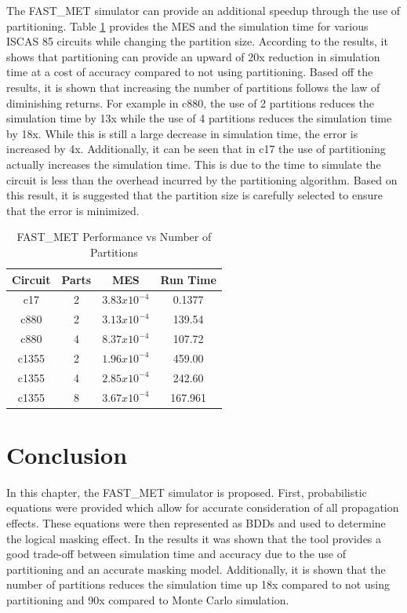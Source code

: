 The FAST\_MET simulator can provide an additional speedup through the use of partitioning. Table \ref{table:restable} provides the MES and the simulation time for various ISCAS 85 circuits while changing the partition size. According to the results, it shows that partitioning can provide an upward of 20x reduction in simulation time at a cost of accuracy compared to not using partitioning. Based off the results, it is shown that increasing the number of partitions follows the law of diminishing returns. For example in c880, the use of 2 partitions reduces the simulation time by 13x while the use of 4 partitions reduces the simulation time by 18x. While this is still a large decrease in simulation time, the error is increased by 4x. Additionally, it can be seen that in c17 the use of partitioning actually increases the simulation time. This is due to the time to simulate the circuit is less than the overhead incurred by the partitioning algorithm. Based on this result, it is suggested that the partition size is carefully selected to ensure that the error is minimized.

\begin{table}[ht]
	\begin{center}
		\caption{FAST\_MET Performance vs Number of Partitions}
		\label{table:restable}
		\begin{tabular}{|c|c|c|c|}
			\hline
			Circuit& Parts & MES & Run Time\\ 
			\hline
			c17 & 2 & $3.83x10^{-4}$ & 0.1377\\
			\hline
			c880 & 2 & $3.13x10^{-4}$ & 139.54\\
			\hline
			c880 & 4 & $8.37x10^{-4}$ & 107.72\\
			\hline
			c1355 & 2 & $1.96x10^{-4}$ & 459.00\\
			\hline
			c1355 & 4 & $2.85x10^{-4}$ & 242.60\\
			\hline
			c1355 & 8 & $3.67x10^{-4}$ & 167.961\\
			\hline
		\end{tabular}
	\end{center}
\end{table}

\section{Conclusion}
In this chapter, the FAST\_MET simulator is proposed. First, probabilistic equations were provided which allow for accurate consideration of all propagation effects. These equations were then represented as BDDs and used to determine the logical masking effect. In the results it was shown that the tool provides a good trade-off between simulation time and accuracy due to the use of partitioning and an accurate masking model. Additionally, it is shown that the number of partitions reduces the simulation time up 18x compared to not using partitioning and 90x compared to Monte Carlo simulation.

